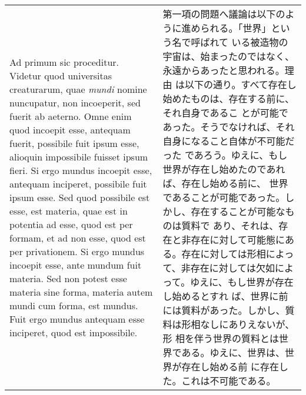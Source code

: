 \documentclass[10pt]{jsarticle} %
\begin{document}
\begin{longtable}{p{21em}p{21em}}
{\huge A}{\sc d primum sic proceditur. Videtur} quod universitas creaturarum, quae
{\itshape mundi} nomine nuncupatur,
non incoeperit, sed fuerit ab aeterno. Omne enim quod incoepit esse,
antequam fuerit, possibile fuit ipsum esse, alioquin impossibile
fuisset ipsum fieri. Si ergo mundus incoepit esse, antequam inciperet,
possibile fuit ipsum esse. Sed quod possibile est esse, est materia,
quae est in potentia ad esse, quod est per formam, et ad non esse,
quod est per privationem. Si ergo mundus incoepit esse, ante mundum
fuit materia. Sed non potest esse materia sine forma, materia autem
mundi cum forma, est mundus. Fuit ergo mundus antequam esse inciperet,
quod est impossibile.


 &

第一項の問題へ議論は以下のように進められる。「世界」という名で呼ばれて
いる被造物の宇宙は、始まったのではなく、永遠からあったと思われる。理由
は以下の通り。すべて存在し始めたものは、存在する前に、それ自身であるこ
とが可能であった。そうでなければ、それ自身になること自体が不可能だった
であろう。ゆえに、もし世界が存在し始めたのであれば、存在し始める前に、
世界であることが可能であった。しかし、存在することが可能なものは質料で
あり、それは、存在と非存在に対して可能態にある。存在に対しては形相によっ
て、非存在に対しては欠如によって。ゆえに、もし世界が存在し始めるとすれ
ば、世界に前には質料があった。しかし、質料は形相なしにありえないが、形
相を伴う世界の質料とは世界である。ゆえに、世界は、世界が存在し始める前
に存在した。これは不可能である。


\end{longtable}

\end{document}
